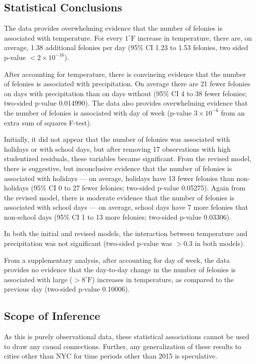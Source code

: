 \documentclass[11pt,notitlepage]{article}
\newcommand{\degf}{^\circ\text{F}}
\begin{document}
\subsection{Statistical Conclusions}

The data provides overwhelming evidence that the number of felonies is associated with temperature. For every $1 \degf$ increase in temperature, there are, on average, 1.38 additional felonies per day (95\% CI 1.23 to 1.53 felonies, two sided p-value $<2\times10^{-16}$).

After accounting for temperature, there is convincing evidence that the number of felonies is associated with precipitation. On average there are 21 fewer felonies on days with precipitation than on days without (95\% CI 4 to 38 fewer felonies; two-sided p-value 0.014990). The data also provides overwhelming evidence that the number of felonies is associated with day of week (p-value $3 \times 10^{-6}$ from an extra sum of squares F-test).

Initially, it did not appear that the number of felonies was associated with holidays or with school days, but after removing 17 observations with high studentized residuals, these variables became significant. From the revised model, there is suggestive, but inconclusive evidence that the number of felonies is associated with holidays --- on average, holidays have 13 fewer felonies than non-holidays (95\% CI 0 to 27 fewer felonies; two-sided p-value 0.05275). Again from the revised model, there is moderate evidence that the number of felonies is associated with school days --- on average, school days have 7 more felonies that non-school days (95\% CI 1 to 13 more felonies; two-sided p-value 0.03306).

In both the initial and revised models, the interaction between temperature and precipitation was not significant (two-sided p-value was $>0.3$ in both models).


From a supplementary analysis, after accounting for day of week, the data provides no evidence that the day-to-day change in the number of felonies is associated with large ($>8 \degf$) increases in temperature, as compared to the previous day (two-sided p-value 0.10006).


\subsection{Scope of Inference}

As this is purely observational data, these statistical associations cannot be used to draw any causal connections. Further, any generalization of these results to cities other than NYC for time periods other than 2015 is speculative.





%
%
\end{document}

